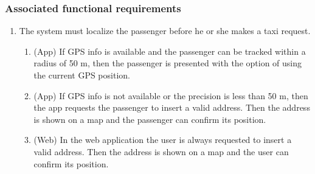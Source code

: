 \subsubsection{Associated functional requirements}
\begin{enumerate}
\item The system must localize the passenger before he or she makes a taxi request.
\begin{enumerate}
\item (App) If GPS info is available and the passenger can be tracked within a radius of 50 m, then the passenger is presented with the option of using the current GPS position.
\item (App) If GPS info is not available or the precision is less than 50 m, then the app requests the passenger to insert a valid address. Then the address is shown on a map and the passenger can confirm its position.
\item (Web) In the web application the user is always requested to insert a valid address. Then the address is shown on a map and the user can confirm its position.
\end{enumerate}


\end{enumerate}
